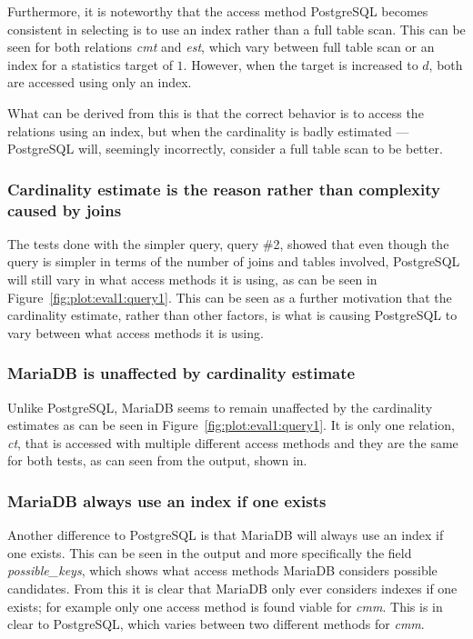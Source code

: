 Furthermore, it is noteworthy that the access method PostgreSQL becomes
consistent in selecting is to use an index rather than a full table scan. This
can be seen for both relations \textit{cmt} and \textit{est}, which vary between
full table scan or an index for a statistics target of $1$. However, when the
target is increased to $d$, both are accessed using only an index.

What can be derived from this is that the correct behavior is to access the
relations using an index, but when the cardinality is badly estimated ---
PostgreSQL will, seemingly incorrectly, consider a full table scan to be better.

\subsubsection{Cardinality estimate is the reason rather than complexity caused
  by joins}
The tests done with the simpler query, query \#2, showed that even though the
query is simpler in terms of the number of joins and tables involved, PostgreSQL
will still vary in what access methods it is using, as can be seen in
Figure~\ref{fig:plot:eval1:query1}. This can be seen as a further motivation that
the cardinality estimate, rather than other factors, is what is causing
PostgreSQL to vary between what access methods it is using.

\subsubsection{MariaDB is unaffected by cardinality estimate}
Unlike PostgreSQL, MariaDB seems to remain unaffected by the cardinality
estimates as can be seen in Figure~\ref{fig:plot:eval1:query1}. It is only one
relation, \textit{ct}, that is accessed with multiple different access methods
and they are the same for both tests, as can seen from the output, shown in.

\subsubsection{MariaDB always use an index if one exists}
Another difference to PostgreSQL is that MariaDB will always use an index if one
exists. This can be seen in the output and more specifically the field
\textit{possible\_keys}, which shows what access methods MariaDB considers
possible candidates. From this it is clear that MariaDB only ever considers
indexes if one exists; for example only one access method is found viable for
\textit{cmm}. This is in clear to PostgreSQL, which varies between two different
methods for \textit{cmm}.

